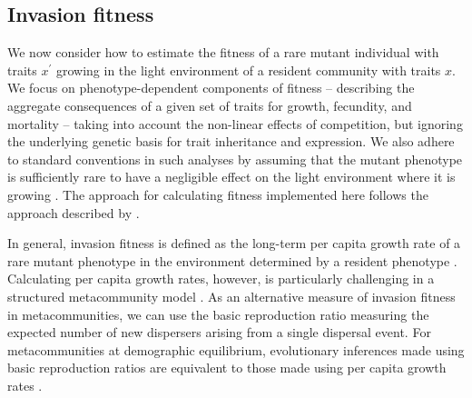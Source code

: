 \documentclass[10pt,twoside]{article}
\begin{document}
\subsection{Invasion fitness}\label{invasion-fitness}

We now consider how to estimate the fitness of a rare mutant individual
with traits \(x^\prime\) growing in the light environment of a resident
community with traits \(x\). We focus on phenotype-dependent components
of fitness -- describing the aggregate consequences of a given set of traits for growth,
fecundity, and mortality -- taking into account the non-linear effects of
competition, but ignoring the underlying genetic
basis for trait inheritance and expression. We also adhere to standard
conventions in such analyses by assuming that the mutant phenotype is sufficiently
rare to have a negligible effect on the light environment where it is growing \citep{Geritz-1998}.
The approach for calculating fitness implemented here follows the approach
described by \cite{Falster-2015}.

In general, invasion fitness is defined as the long-term per capita
growth rate of a rare mutant phenotype in the environment
determined by a resident phenotype \citep{Metz-1992}. Calculating
per capita growth rates, however, is particularly challenging in a
structured metacommunity model \citep{Gyllenberg-2001, Metz-2001}. As
an alternative measure of invasion fitness in metacommunities, we can use the basic reproduction
ratio measuring the expected number of new dispersers arising from a
single dispersal event. For metacommunities at demographic equilibrium, evolutionary inferences made using basic
reproduction ratios are equivalent to those made using per capita growth
rates
\citep{Gyllenberg-2001, Metz-2001}.
\end{document}
